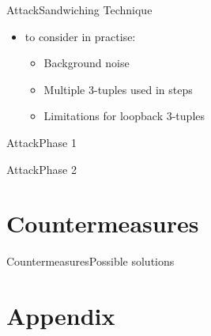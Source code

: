 \documentclass[aspectratio=169, hyperref={colorlinks=true, allcolors=SecondaryColor}, c]{beamer}
\begin{document}
\begin{frame}[fragile]{Attack}{Sandwiching Technique}
	\begin{itemize}
		\item to consider in practise:
		\begin{itemize}
			\item \alert{Background noise}

			\item \alert{Multiple 3-tuples used in steps}
			\item \alert{Limitations for loopback 3-tuples}
		\end{itemize}
	\end{itemize}
\end{frame}

\ifattackphaseone
	\begin{frame}[fragile]{Attack}{Phase 1}
		\begin{center}
			\begin{adjustbox}{scale=0.7}
				
			\end{adjustbox}
		\end{center}
	\end{frame}
\else
\fi

\ifattackphaseone
	\begin{frame}[fragile]{Attack}{Phase 2}
		\begin{center}
			\begin{adjustbox}{scale=0.7}
				
			\end{adjustbox}
		\end{center}
	\end{frame}
\else
\fi

\ifcountermeasures
	\section{Countermeasures}

	\begin{frame}[fragile]{Countermeasures}{Possible solutions}
	\end{frame}
\else
\fi

\ifappendix
	\section{Appendix}
\end{document}
